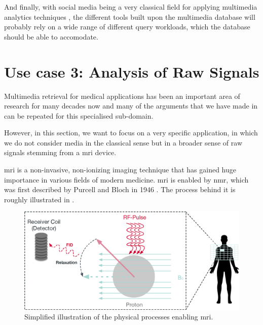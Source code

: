 And finally, with social media being a very classical field for applying multimedia analytics techniques \cite{Pouyanfar:2018,Jonson:2016}, the different tools built upon the multimedia database will probably rely on a wide range of different query workloads, which the database should be able to accomodate.

\section{Use case 3: Analysis of Raw Signals}
\label{section:application_mrf}

Multimedia retrieval for medical applications has been an important area of research for many decades now \cite{Mueller:2017Retrieval,Mueller:2004Review} and many of the arguments that we have made in  can be repeated for this specialised sub-domain.

However, in this section, we want to focus on a very specific application, in which we do not consider media in the classical sense but in a broader sense of raw signals stemming from a \acrfull{mri} device.

\acrshort{mri} is a non-invasive, non-ionizing imaging technique that has gained huge importance in various fields of modern medicine. \acrshort{mri} is enabled by \acrfull{nmr}, which was first described by Purcell and Bloch in 1946 \cite{Bloch:1946Nuclear,Purcell:1946Resonance}. The process behind it is roughly illustrated in .

\begin{figure}[b]
    \centering
    \includegraphics[width=\textwidth]{figures/mri.eps}
    \caption{Simplified illustration of the physical processes enabling \acrshort{mri}.}
    \label{figure:mri}
\end{figure}

